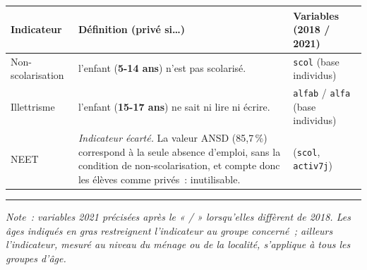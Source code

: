 \documentclass[11pt,a4paper]{article}
\newcommand{\dimtitle}[1]{\vspace{4pt}\noindent{\color{entete}\large\bfseries #1}\par\vspace{2pt}}
\begin{document}
\dimtitle{7. Éducation}
\begin{tabularx}{\textwidth}{L{3.1cm} X L{3.3cm}}
\toprule
\textbf{Indicateur} & \textbf{Définition (privé si\dots)} & \textbf{Variables (2018 / 2021)} \\
\midrule
Non-scolarisation & l'enfant (\textbf{5-14 ans}) n'est pas scolarisé. & \texttt{scol} (base individus) \\
Illettrisme & l'enfant (\textbf{15-17 ans}) ne sait ni lire ni écrire. & \texttt{alfab} / \texttt{alfa} (base individus) \\
NEET & \emph{Indicateur écarté.} La valeur ANSD (85,7\,\%) correspond à la seule absence d'emploi, sans la condition de non-scolarisation, et compte donc les élèves comme privés~: inutilisable. & (\texttt{scol}, \texttt{activ7j}) \\
\bottomrule
\end{tabularx}

\vspace{10pt}
\hrule
\vspace{6pt}
{\small\itshape Note~: variables 2021 précisées après le « / » lorsqu'elles
diffèrent de 2018. Les âges indiqués en gras restreignent l'indicateur au
groupe concerné~; ailleurs l'indicateur, mesuré au niveau du ménage ou de la
localité, s'applique à tous les groupes d'âge.}
\end{document}
